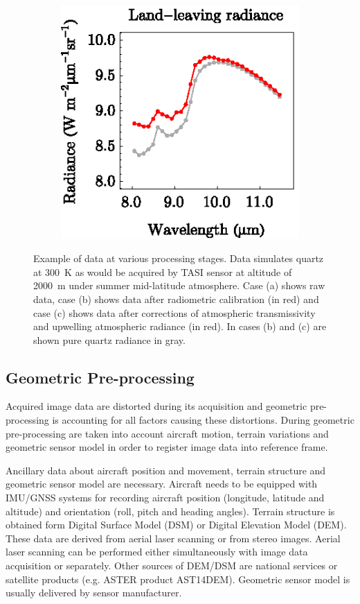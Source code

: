 \begin{figure}[htb]
	\hspace{1em}
	\begin{subfigure}[t]{.3\linewidth}
		\centering
		\includegraphics[scale=1]{pics/Chapter_02/calibration-3-Lll.eps}
		\vspace{-0.4cm}
		\caption{}
	\end{subfigure}
	\vspace{1.5 em}
	\caption{Example of data at various processing stages. Data simulates quartz at \SI{300}{\kelvin} as would be acquired by TASI sensor at altitude of \SI{2000}{\meter} under summer mid-latitude atmosphere. Case (a) shows raw data, case (b) shows data after radiometric calibration (in red) and case (c) shows data after corrections of atmospheric transmissivity and upwelling atmospheric radiance (in red). In cases (b) and (c) are shown pure quartz radiance in gray.}
	\label{fig:RadAtmCorOfQuartz}
\end{figure}

\subsection*{Geometric Pre-processing}

Acquired image data are distorted during its acquisition and geometric pre-processing is accounting for all factors causing these distortions. During geometric pre-processing are taken into account aircraft motion, terrain variations and geometric sensor model in order to register image data into reference frame.

Ancillary data about aircraft position and movement, terrain structure and geometric sensor model are necessary. Aircraft needs to be equipped with IMU/GNSS systems for recording aircraft position (longitude, latitude and altitude) and orientation (roll, pitch and heading angles). Terrain structure is obtained form Digital Surface Model (DSM) or Digital Elevation Model (DEM). These data are derived from aerial laser scanning or from stereo images. Aerial laser scanning can be performed either simultaneously with image data acquisition or separately. Other sources of DEM/DSM are national services or satellite products (e.g. ASTER product AST14DEM). Geometric sensor model is usually delivered by sensor manufacturer.

